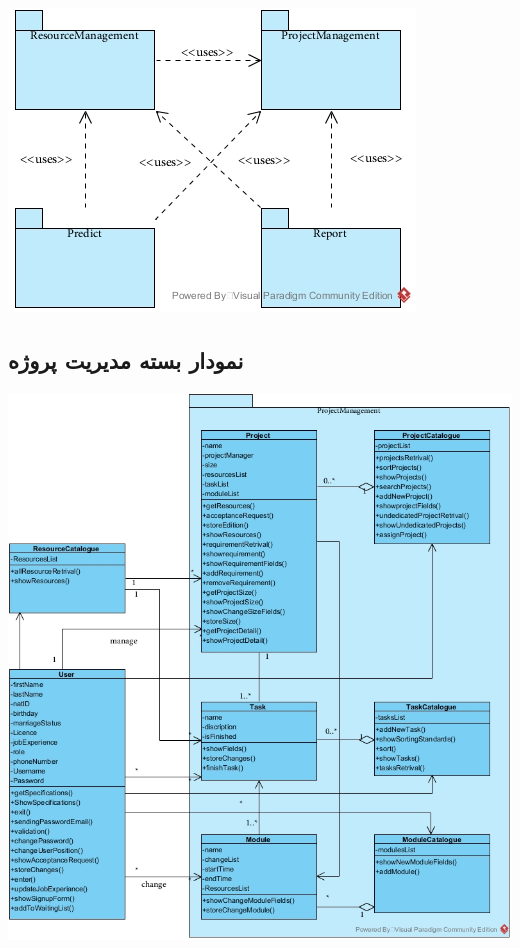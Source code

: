 \vspace{2cm}
\begin{center}
\includegraphics[width=\textwidth]{PackageDiagram/PackageDiagram.jpg}
\end{center}


\newpage
\vspace{1cm}
\subsection{نمودار بسته مدیریت پروژه}

\vspace{2cm}
\begin{center}
\includegraphics[width=\textwidth]{PackageDiagram/ProjectManagementPackage.jpg}
\end{center}

